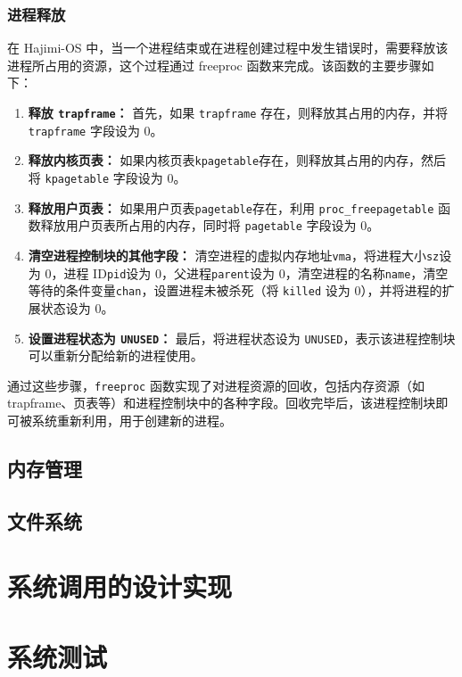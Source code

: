 \documentclass[UTF8]{article}
\begin{document}
      \subsubsection{进程释放}
      在 Hajimi-OS 中，当一个进程结束或在进程创建过程中发生错误时，需要释放该进程所占用的资源，这个过程通过 freeproc 函数来完成。该函数的主要步骤如下：
      \begin{enumerate}[label=\textbf{\arabic*}., wide, labelwidth=!, labelindent=0pt]
        \item \textbf{释放 \texttt{trapframe}：} 首先，如果 \texttt{trapframe} 存在，则释放其占用的内存，并将 \texttt{trapframe} 字段设为 0。
        \item \textbf{释放内核页表：} 如果内核页表\texttt{kpagetable}存在，则释放其占用的内存，然后将 \texttt{kpagetable} 字段设为 0。
        \item \textbf{释放用户页表：} 如果用户页表\texttt{pagetable}存在，利用 \texttt{proc\_freepagetable} 函数释放用户页表所占用的内存，同时将 \texttt{pagetable} 字段设为 0。
        \item \textbf{清空进程控制块的其他字段：} 清空进程的虚拟内存地址\texttt{vma}，将进程大小\texttt{sz}设为 0，进程 ID\texttt{pid}设为 0，父进程\texttt{parent}设为 0，清空进程的名称\texttt{name}，清空等待的条件变量\texttt{chan}，设置进程未被杀死（将 \texttt{killed} 设为 0），并将进程的扩展状态设为 0。
        \item \textbf{设置进程状态为 \texttt{UNUSED}：} 最后，将进程状态设为 \texttt{UNUSED}，表示该进程控制块可以重新分配给新的进程使用。
      \end{enumerate}
      通过这些步骤，\texttt{freeproc} 函数实现了对进程资源的回收，包括内存资源（如 trapframe、页表等）和进程控制块中的各种字段。回收完毕后，该进程控制块即可被系统重新利用，用于创建新的进程。
    
    \subsection{内存管理}

    
    \subsection{文件系统}

  \section{系统调用的设计实现}

  \section{系统测试}
\end{document}
